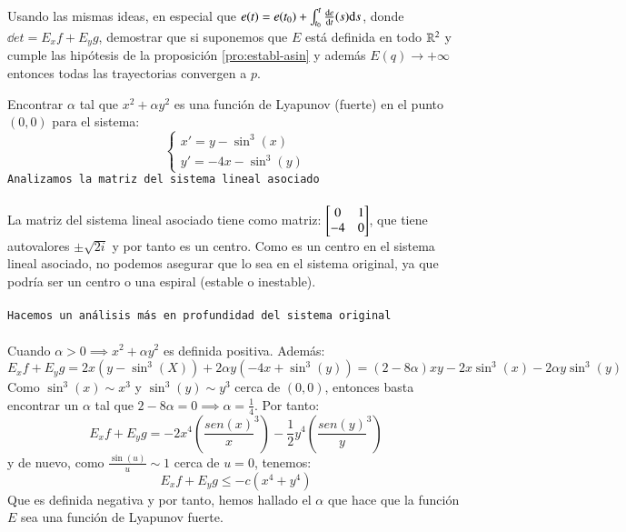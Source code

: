 \begin{th_ex}
    Usando las mismas ideas, en especial que $e(t) = e(t_0) + \int_{t_0}^t \frac{\mathrm{d}e}{\mathrm{d}t}(s) \mathrm{d} s$, donde $\dd{e}{t} = E_x f + E_y g$, demostrar que si suponemos que $E$ está definida en todo $\mathbb{R}^2$ y cumple las hipótesis de la proposición \ref{pro:establ-asin} y además $E(q) \to +\infty$ entonces todas las trayectorias convergen a $p$.
\end{th_ex}
\begin{eg}
    Encontrar $\alpha$ tal que $x^2 + \alpha y^2$ es una función de Lyapunov (fuerte) en el punto $(0, 0)$ para el sistema:
    $$
        \begin{cases}
            x' = y - \sin^3(x)\\
            y' = -4x -\sin^3(y)
        \end{cases}
    $$
    \texttt{Analizamos la matriz del sistema lineal asociado}\\\\
    La matriz del sistema lineal asociado tiene como matriz: $\mx{0 & 1 \\ -4 & 0}$, que tiene autovalores $\pm \sqrt{2i}$ y por tanto es un centro. Como es un centro en el sistema lineal asociado, no podemos asegurar que lo sea en el sistema original, ya que podría ser un centro o una espiral (estable o inestable).\\\\
    \texttt{Hacemos un análisis más en profundidad del sistema original}\\\\
    Cuando $\alpha > 0 \implies x^2 + \alpha y^2$ es definida positiva. Además:
    $$
        E_x f + E_y g = 2x(y-\sin^3(X)) + 2\alpha y(-4x + \sin^3(y)) = (2 - 8\alpha) xy - 2x \sin^3(x) - 2 \alpha y \sin^3(y)
    $$
    Como $\sin^3(x) \sim x^3$ y $\sin^3(y) \sim y^3$ cerca de $(0,0)$, entonces basta encontrar un $\alpha$ tal que $2 - 8\alpha = 0 \implies \alpha = \frac{1}{4}$. Por tanto:
    $$
        E_x f + E_y g = -2x^4 \left(\frac{sen(x)}{x}^3\right) - \frac{1}{2}y^4 \left(\frac{sen(y)}{y}^3\right)
    $$
    y de nuevo, como $\frac{\sin(u)}{u} \sim 1$ cerca de $u = 0$, tenemos:
    $$
        E_x f + E_y g \leq -c (x^4 + y^4)
    $$
    Que es definida negativa y por tanto, hemos hallado el $\alpha$ que hace que la función $E$ sea una función de Lyapunov fuerte.
\end{eg}
